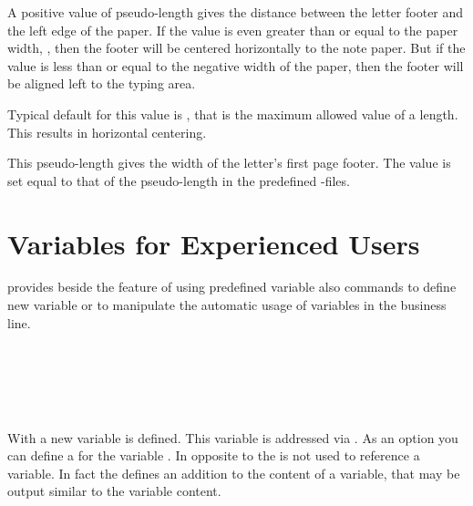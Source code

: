 \begin{Declaration}
\end{Declaration}
%
%
A positive value of pseudo-length 
gives the distance between the letter footer and the left edge of the
paper. If the value is even greater than or equal to the paper width,
, then the footer will be centered
horizontally to the note paper. But if the value is less than or equal to the
negative width of the paper, then the footer will be aligned left to the
typing area.

Typical default for this value is ,
that is the maximum allowed value of a length. This results in horizontal
centering.%
%


\begin{Declaration}
\end{Declaration}
%
This pseudo-length gives the width of the letter's first page footer. The
value is set equal to that of the pseudo-length
%
 in the predefined
-files.%
%
%
%
%
%
%

\section{Variables for Experienced Users}
\label{sec:scrlttr2-experts.variables}

\KOMAScript{} provides beside the feature of using predefined variable also
commands to define new variable or to manipulate the automatic usage of
variables in the business line.

\begin{Declaration}
  \\
  \\
  \\
  \\
\end{Declaration}
%
%
%
%
%
With  a new variable is defined. This variable is
addressed via . As an option you can define a
 for the variable . In opposite to 
the  is not used to reference a variable. In fact the
 defines an addition to the content of a variable, that may
be output similar to the variable content.

